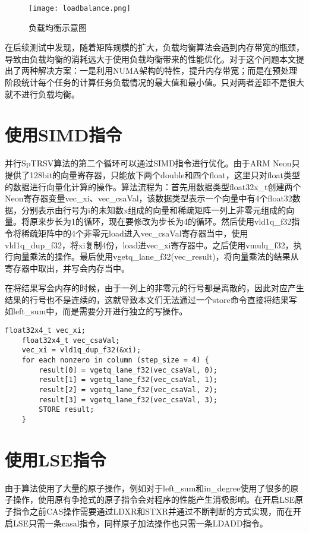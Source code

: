 \begin{figure}[htbp]
    \centering
    \texttt{[image: loadbalance.png]}
    \caption{负载均衡示意图}
    \label{负载均衡示意图}
\end{figure}

在后续测试中发现，随着矩阵规模的扩大，负载均衡算法会遇到内存带宽的瓶颈，导致由负载均衡的消耗远大于使用负载均衡带来的性能优化。对于这个问题本文提出了两种解决方案：一是利用NUMA架构的特性，提升内存带宽；而是在预处理阶段统计每个任务的计算任务负载情况的最大值和最小值。只对两者差距不是很大就不进行负载均衡。


\section{使用SIMD指令}

并行SpTRSV算法的第二个循环可以通过SIMD指令进行优化。由于ARM Neon只提供了128bit的向量寄存器，只能放下两个double和四个float，这里只对float类型的数据进行向量化计算的操作。算法流程为：首先用数据类型float32x\_t创建两个Neon寄存器变量vec\_xi、vec\_csaVal，该数据类型表示一个向量中有4个float32数据，分别表示由行号为i的未知数x组成的向量和稀疏矩阵一列上非零元组成的向量。将原来步长为1的循环，现在要修改为步长为4的循环。然后使用vld1q\_f32指令将稀疏矩阵中的4个非零元load进入vec\_csaVal寄存器当中，使用vld1q\_dup\_f32，将xi复制4份，load进vec\_xi寄存器中。之后使用vmulq\_f32，执行向量乘法的操作。最后使用vgetq\_lane\_f32(vec\_result)，将向量乘法的结果从寄存器中取出，并写会内存当中。

在将结果写会内存的时候，由于一列上的非零元的行号都是离散的，因此对应产生结果的行号也不是连续的，这就导致本文们无法通过一个store命令直接将结果写如left\_sum中，而是需要分开进行独立的写操作。

\begin{lstlisting}[caption={SIMD指令优化}]
    float32x4_t vec_xi;
    float32x4_t vec_csaVal;
    vec_xi = vld1q_dup_f32(&xi);
    for each nonzero in column (step_size = 4) {
        result[0] = vgetq_lane_f32(vec_csaVal, 0);
        result[1] = vgetq_lane_f32(vec_csaVal, 1);
        result[2] = vgetq_lane_f32(vec_csaVal, 2);
        result[3] = vgetq_lane_f32(vec_csaVal, 3);
        STORE result;
    }
\end{lstlisting}

\section{使用LSE指令}

由于算法使用了大量的原子操作，例如对于left\_sum和in\_degree使用了很多的原子操作，使用原有争抢式的原子指令会对程序的性能产生消极影响。在开启LSE原子指令之前CAS操作需要通过LDXR和STXR并通过不断判断的方式实现，而在开启LSE只需一条casal指令，同样原子加法操作也只需一条LDADD指令。

